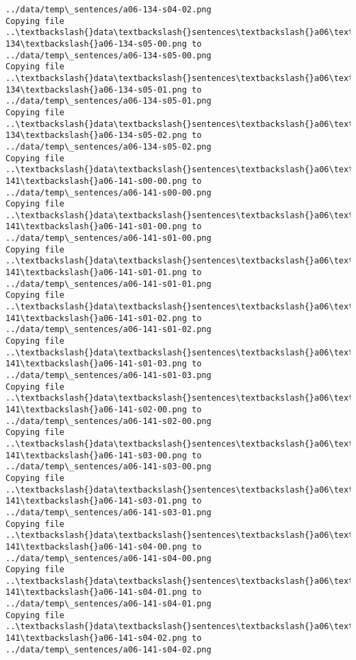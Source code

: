 \documentclass[11pt]{article}
\begin{document}
\begin{Verbatim}[commandchars=\\\{\}]
../data/temp\_sentences/a06-134-s04-02.png
Copying file ..\textbackslash{}data\textbackslash{}sentences\textbackslash{}a06\textbackslash{}a06-134\textbackslash{}a06-134-s05-00.png to
../data/temp\_sentences/a06-134-s05-00.png
Copying file ..\textbackslash{}data\textbackslash{}sentences\textbackslash{}a06\textbackslash{}a06-134\textbackslash{}a06-134-s05-01.png to
../data/temp\_sentences/a06-134-s05-01.png
Copying file ..\textbackslash{}data\textbackslash{}sentences\textbackslash{}a06\textbackslash{}a06-134\textbackslash{}a06-134-s05-02.png to
../data/temp\_sentences/a06-134-s05-02.png
Copying file ..\textbackslash{}data\textbackslash{}sentences\textbackslash{}a06\textbackslash{}a06-141\textbackslash{}a06-141-s00-00.png to
../data/temp\_sentences/a06-141-s00-00.png
Copying file ..\textbackslash{}data\textbackslash{}sentences\textbackslash{}a06\textbackslash{}a06-141\textbackslash{}a06-141-s01-00.png to
../data/temp\_sentences/a06-141-s01-00.png
Copying file ..\textbackslash{}data\textbackslash{}sentences\textbackslash{}a06\textbackslash{}a06-141\textbackslash{}a06-141-s01-01.png to
../data/temp\_sentences/a06-141-s01-01.png
Copying file ..\textbackslash{}data\textbackslash{}sentences\textbackslash{}a06\textbackslash{}a06-141\textbackslash{}a06-141-s01-02.png to
../data/temp\_sentences/a06-141-s01-02.png
Copying file ..\textbackslash{}data\textbackslash{}sentences\textbackslash{}a06\textbackslash{}a06-141\textbackslash{}a06-141-s01-03.png to
../data/temp\_sentences/a06-141-s01-03.png
Copying file ..\textbackslash{}data\textbackslash{}sentences\textbackslash{}a06\textbackslash{}a06-141\textbackslash{}a06-141-s02-00.png to
../data/temp\_sentences/a06-141-s02-00.png
Copying file ..\textbackslash{}data\textbackslash{}sentences\textbackslash{}a06\textbackslash{}a06-141\textbackslash{}a06-141-s03-00.png to
../data/temp\_sentences/a06-141-s03-00.png
Copying file ..\textbackslash{}data\textbackslash{}sentences\textbackslash{}a06\textbackslash{}a06-141\textbackslash{}a06-141-s03-01.png to
../data/temp\_sentences/a06-141-s03-01.png
Copying file ..\textbackslash{}data\textbackslash{}sentences\textbackslash{}a06\textbackslash{}a06-141\textbackslash{}a06-141-s04-00.png to
../data/temp\_sentences/a06-141-s04-00.png
Copying file ..\textbackslash{}data\textbackslash{}sentences\textbackslash{}a06\textbackslash{}a06-141\textbackslash{}a06-141-s04-01.png to
../data/temp\_sentences/a06-141-s04-01.png
Copying file ..\textbackslash{}data\textbackslash{}sentences\textbackslash{}a06\textbackslash{}a06-141\textbackslash{}a06-141-s04-02.png to
../data/temp\_sentences/a06-141-s04-02.png

\end{Verbatim}
\end{document}
